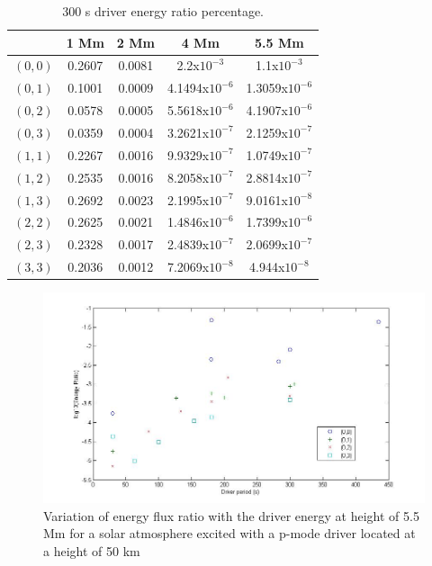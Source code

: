 \documentclass[authoryear,final,1p]{elsarticle}
\begin{document}
\begin{table}
\centering
\begin{tabular}{c c c c c }
\hline
   &  1 Mm & 2 Mm & 4 Mm & 5.5 Mm \\
\hline
$(0, 0)$ &  0.2607 & 0.0081 & 2.2x$10^{-3}$ &  1.1x$10^{-3}$\\
\hline
$(0, 1)$ & 0.1001 & 0.0009 & 4.1494x$10^{-6}$ &  1.3059x$10^{-6}$\\
\hline
$(0, 2)$ & 0.0578 & 0.0005 & 5.5618x$10^{-6}$ &  4.1907x$10^{-6}$\\
\hline
$(0, 3)$ & 0.0359 & 0.0004 &3.2621x$10^{-7}$ &  2.1259x$10^{-7}$\\
\hline
$(1, 1)$ & 0.2267 & 0.0016 & 9.9329x$10^{-7}$ &  1.0749x$10^{-7}$\\
\hline
$(1, 2)$ & 0.2535 & 0.0016 & 8.2058x$10^{-7}$ &  2.8814x$10^{-7}$\\
\hline
$(1, 3)$ & 0.2692 & 0.0023 & 2.1995x$10^{-7}$ &  9.0161x$10^{-8}$\\
\hline
$(2, 2)$ & 0.2625 & 0.0021 & 1.4846x$10^{-6}$ &  1.7399x$10^{-6}$\\
\hline
$(2, 3)$ & 0.2328 & 0.0017 & 2.4839x$10^{-7}$ &  2.0699x$10^{-7}$\\
\hline
$(3, 3)$ & 0.2036 & 0.0012 & 7.2069x$10^{-8}$ &  4.944x$10^{-8}$\\
\hline
\end{tabular} 
\caption{300 s driver energy ratio percentage.}
\end{table}

\begin{figure}[t]
\includegraphics[scale=0.4]{imagesn/ratio_varoverdrve_eflux_vperiod_for modes_5p5Mm.jpg}
\caption{Variation of energy flux ratio with the driver energy at height of 5.5 Mm for a solar atmosphere excited with a p-mode driver located at a height of 50 km}
\label{Fig17}
\end{figure}
\end{document}
